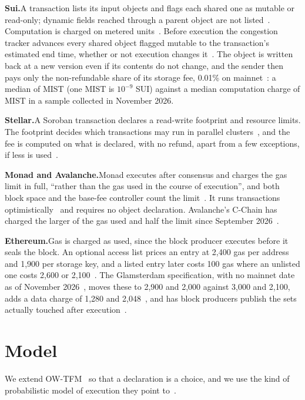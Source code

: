 \documentclass[conference,compsoc]{IEEEtran}
\numberwithin{equation}{section}
\theoremstyle{plain}
\theoremstyle{definition}
\theoremstyle{remark}
\newcommand{\runin}[1]{\par\smallskip\noindent\textbf{#1.}\enspace}
\begin{document}
\runin{Sui}A transaction lists its input objects and flags each shared one as mutable or read-only; dynamic fields reached through a parent object are not listed~\cite{suidocs_versioning}. Computation is charged on metered units~\cite{suidocs_gas}. Before execution the congestion tracker advances every shared object flagged mutable to the transaction's estimated end time, whether or not execution changes it~\cite{suicode,suidocs_lfm}. The object is written back at a new version even if its contents do not change, and the sender then pays only the non-refundable share of its storage fee, 0.01\% on mainnet~\cite{suicode}: a median of \suiUnchangedFee{} MIST (one MIST is $10^{-9}$ SUI) against a median computation charge of \suiComputationMedian{} MIST in a sample collected in November 2026.

\runin{Stellar}A Soroban transaction declares a read-write footprint and resource limits. The footprint decides which transactions may run in parallel clusters~\cite{cap0063}, and the fee is computed on what is declared, with no refund, apart from a few exceptions, if less is used~\cite{stellarfees}.

\runin{Monad and Avalanche}Monad executes after consensus and charges the gas limit in full, ``rather than the gas used in the course of execution'', and both block space and the base-fee controller count the limit~\cite{monaddocs_gas}. It runs transactions optimistically~\cite{monaddocs_parallel} and requires no object declaration. Avalanche's C-Chain has charged the larger of the gas used and half the limit since September 2026~\cite{acp194,helicon}.

\runin{Ethereum}Gas is charged as used, since the block producer executes before it seals the block. An optional access list prices an entry at 2,400 gas per address and 1,900 per storage key, and a listed entry later costs 100 gas where an unlisted one costs 2,600 or 2,100~\cite{eip2929,eip2930}. The Glamsterdam specification, with no mainnet date as of November 2026~\cite{glamsterdamannounce,glamsterdamdelay}, moves these to 2,900 and 2,000 against 3,000 and 2,100, adds a data charge of 1,280 and 2,048~\cite{eip8038,eip7981}, and has block producers publish the sets actually touched after execution~\cite{eip7928}.
\section{Model}\label{sec:model}

We extend OW-TFM~\cite{wadhwa2026perils} so that a declaration is a choice, and we use the kind of probabilistic model of execution they point to~\cite[p.~1100]{wadhwa2026perils}.
\end{document}
